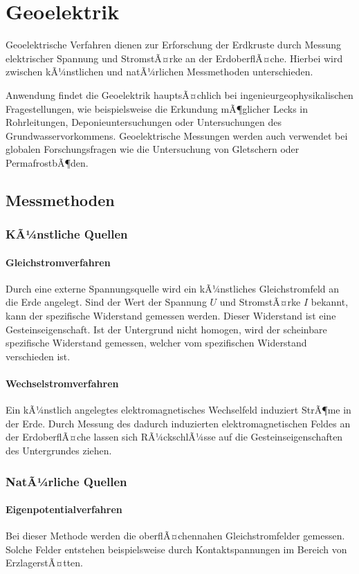 \chapter{Geoelektrik}
Geoelektrische Verfahren dienen zur Erforschung der Erdkruste durch Messung elektrischer Spannung und StromstÃ¤rke an der ErdoberflÃ¤che. Hierbei wird zwischen kÃ¼nstlichen und natÃ¼rlichen Messmethoden unterschieden.

Anwendung findet die Geoelektrik hauptsÃ¤chlich bei ingenieurgeophysikalischen Fragestellungen, wie beispielsweise die Erkundung mÃ¶glicher Lecks in Rohrleitungen, Deponieuntersuchungen oder Untersuchungen des Grundwasservorkommens. Geoelektrische Messungen werden auch verwendet bei globalen Forschungsfragen wie die Untersuchung von Gletschern oder PermafrostbÃ¶den.

\section{Messmethoden}
\subsection{KÃ¼nstliche Quellen}
\subsubsection{Gleichstromverfahren}
Durch eine externe Spannungsquelle wird ein kÃ¼nstliches Gleichstromfeld an die Erde angelegt. Sind der Wert der Spannung $U$ und StromstÃ¤rke $I$ bekannt, kann der spezifische Widerstand gemessen werden. Dieser Widerstand ist eine Gesteinseigenschaft. Ist der Untergrund nicht homogen, wird der scheinbare spezifische Widerstand gemessen, welcher vom spezifischen Widerstand verschieden ist.

\subsubsection{Wechselstromverfahren}
Ein kÃ¼nstlich angelegtes elektromagnetisches Wechselfeld induziert StrÃ¶me in der Erde. Durch Messung des dadurch induzierten elektromagnetischen Feldes an der ErdoberflÃ¤che lassen sich RÃ¼ckschlÃ¼sse auf die Gesteinseigenschaften des Untergrundes ziehen.

\subsection{NatÃ¼rliche Quellen}
\subsubsection{Eigenpotentialverfahren}
Bei dieser Methode werden die oberflÃ¤chennahen Gleichstromfelder gemessen. Solche Felder entstehen beispielsweise durch Kontaktspannungen im Bereich von ErzlagerstÃ¤tten.

